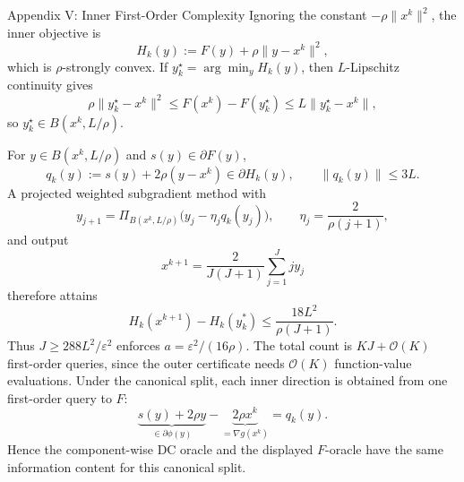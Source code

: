 \documentclass[10pt]{beamer}
\begin{document}
\begin{frame}{Appendix V: Inner First-Order Complexity}
\footnotesize
Ignoring the constant $-\rho\|x^k\|^2$, the inner objective is
\[
    H_k(y):=F(y)+\rho\|y-x^k\|^2,
\]
which is $\rho$-strongly convex. If $y_k^\star=\arg\min_y H_k(y)$, then
$L$-Lipschitz continuity gives
\[
    \rho\|y_k^\star-x^k\|^2
    \le F(x^k)-F(y_k^\star)
    \le L\|y_k^\star-x^k\|,
\]
so $y_k^\star\in B(x^k,L/\rho)$.

\medskip
For $y\in B(x^k,L/\rho)$ and $s(y)\in\partial F(y)$,
\[
    q_k(y):=s(y)+2\rho(y-x^k)\in\partial H_k(y),
    \qquad
    \|q_k(y)\|\le3L.
\]
A projected weighted subgradient method with
\[
    y_{j+1}=\Pi_{B(x^k,L/\rho)}
    \bigl(y_j-\eta_jq_k(y_j)\bigr),
    \qquad \eta_j=\frac{2}{\rho(j+1)},
\]
and output
\[
    x^{k+1}=\frac{2}{J(J+1)}\sum_{j=1}^J j y_j
\]
therefore attains
\[
    H_k(x^{k+1})-H_k(y_k^*)
    \le\frac{18L^2}{\rho(J+1)}.
\]
Thus $J\ge288L^2/\varepsilon^2$ enforces
$a=\varepsilon^2/(16\rho)$.
The total count is $KJ+\mathcal O(K)$ first-order queries, since
the outer certificate needs $\mathcal O(K)$ function-value evaluations.
\medskip
Under the canonical split, each inner direction is obtained from one
first-order query to $F$:
\[
    \underbrace{s(y)+2\rho y}_{\in\partial\phi(y)}
    -\underbrace{2\rho x^k}_{=\nabla g(x^k)}
    =q_k(y).
\]
Hence the component-wise DC oracle and the displayed $F$-oracle have the
same information content for this canonical split.
\end{frame}






  
\end{document}
